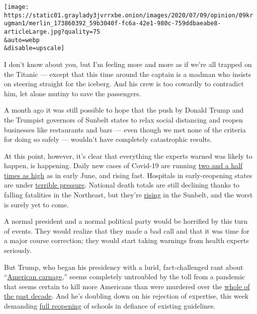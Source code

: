 \texttt{[image: https://static01.graylady3jvrrxbe.onion/images/2020/07/09/opinion/09krugman1/merlin\_173860392\_59b3040f-fc6a-42e1-980c-759ddbaeabe8-articleLarge.jpg?quality=75\\\&auto=webp\\\&disable=upscale]}

I don't know about you, but I'm feeling more and more as if we're all
trapped on the Titanic --- except that this time around the captain is a
madman who insists on steering straight for the iceberg. And his crew is
too cowardly to contradict him, let alone mutiny to save the passengers.

A month ago it was still possible to hope that the push by Donald Trump
and the Trumpist governors of Sunbelt states to relax social distancing
and reopen businesses like restaurants and bars --- even though we met
none of the criteria for doing so safely --- wouldn't have completely
catastrophic results.

At this point, however, it's clear that everything the experts warned
was likely to happen, is happening. Daily new cases of Covid-19 are
running
\href{https://www.nytimes3xbfgragh.onion/interactive/2020/us/coronavirus-us-cases.html?action=click\&module=Top\%20Stories\&pgtype=Homepage}{two
and a half times as high} as in early June, and rising fast. Hospitals
in early-reopening states are under
\href{https://www.washingtonpost.com/politics/surge-in-virus-hospitalizations-strains-hospitals-in-several-states/2020/07/08/12855e5e-c135-11ea-864a-0dd31b9d6917_story.html}{terrible
pressure}. National death totals are still declining thanks to falling
fatalities in the Northeast, but they're
\href{https://twitter.com/COVID19Tracking/status/1281011411901177858}{rising}
in the Sunbelt, and the worst is surely yet to come.

A normal president and a normal political party would be horrified by
this turn of events. They would realize that they made a bad call and
that it was time for a major course correction; they would start taking
warnings from health experts seriously.

But Trump, who began his presidency with a lurid, fact-challenged rant
about
``\href{https://www.nytimes3xbfgragh.onion/interactive/projects/cp/opinion/presidential-inauguration-2017/trump-gives-us-american-carnage}{American
carnage},'' seems completely untroubled by the toll from a pandemic that
seems certain to kill more Americans than were murdered over the
\href{http://www.disastercenter.com/crime/uscrime.htm}{whole of the past
decade}. And he's doubling down on his rejection of expertise, this week
demanding
\href{https://www.nytimes3xbfgragh.onion/2020/07/08/us/politics/trump-schools-reopening.html?action=click\&module=Well\&pgtype=Homepage\&section=Politics}{full
reopening} of schools in defiance of existing guidelines.

